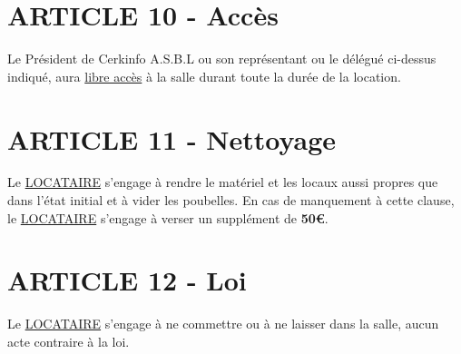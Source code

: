 \documentclass{article}
\begin{document}
\section*{ARTICLE 10 - Accès}
Le Président de Cerkinfo A.S.B.L ou son représentant ou le délégué ci-dessus indiqué, aura \underline{libre accès} à la salle durant toute la durée de la location.

\section*{ARTICLE 11 - Nettoyage}
Le \underline{LOCATAIRE} s’engage à rendre le matériel et les locaux aussi propres que dans l’état initial et à vider les poubelles. En cas de manquement à cette clause, le \underline{LOCATAIRE} s’engage à verser un supplément de \textbf{50€}.

\section*{ARTICLE 12 - Loi}
Le \underline{LOCATAIRE} s’engage à ne commettre ou à ne laisser dans la salle, aucun acte contraire à la loi.
\end{document}

